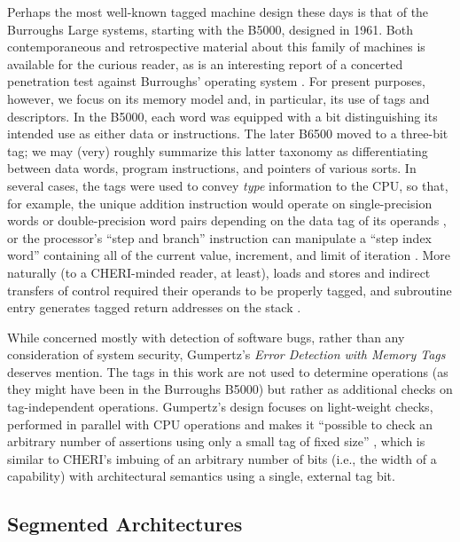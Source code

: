 Perhaps the most well-known tagged machine design these days is that of the
Burroughs Large systems, starting with the B5000, designed in 1961.  Both
contemporaneous \cite{Creech69,Burroughs-B6700,Organick73} and retrospective
\cite{Mayer82,Barton87} material about this family of machines is available
for the curious reader, as is an interesting report of a concerted
penetration test against Burroughs' operating system \cite{Wilkinson}.  For
present purposes, however, we focus on its memory model and, in particular,
its use of tags and descriptors.  In the B5000, each word was equipped with
a bit distinguishing its intended use as either data or instructions.  The
later B6500 moved to a three-bit tag; we may (very) roughly summarize this
latter taxonomy as differentiating between data words, program instructions,
and pointers of various sorts.  In several cases, the tags were used to
convey \emph{type} information to the CPU, so that, for example, the unique
addition instruction would operate on single-precision words or
double-precision word pairs depending on the data tag of its operands
\cite[p. 97]{Organick73}, or the processor's ``step and branch'' instruction
can manipulate a ``step index word'' containing all of the current value,
increment, and limit of iteration \cite[p. 7-5]{Burroughs-B6700}.  More
naturally (to a CHERI-minded reader, at least), loads and stores and
indirect transfers of control required their operands to be properly tagged,
and subroutine entry generates tagged return addresses on the stack
\cite[ch. 7]{Burroughs-B6700}.

While concerned mostly with detection of software bugs, rather than any
consideration of system security, Gumpertz's \emph{Error Detection with
Memory Tags} \cite{Gumpertz81} deserves mention.  The tags in this work are
not used to determine operations (as they might have been in the Burroughs
B5000) but rather as additional checks on tag-independent operations.
Gumpertz's design focuses on light-weight checks, performed in parallel with
CPU operations and makes it ``possible to check an arbitrary number of
assertions using only a small tag of fixed size'' \cite[p.  i]{Gumpertz81},
which is similar to CHERI's imbuing of an arbitrary number of bits (i.e.,
the width of a capability) with architectural semantics using a single,
external tag bit.

\subsection{Segmented Architectures} %

